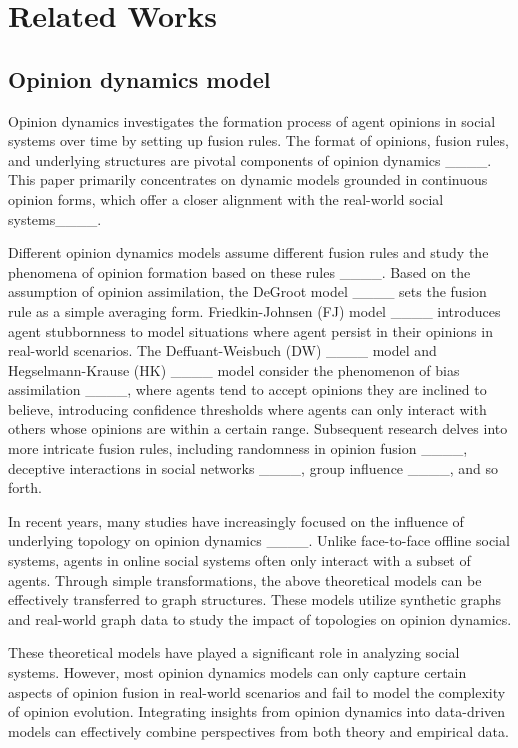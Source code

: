 \section{Related Works}
\subsection{Opinion dynamics model}

Opinion dynamics investigates the formation process of agent opinions in social systems over time by setting up fusion rules. The format of opinions, fusion rules, and underlying structures are pivotal components of opinion dynamics ____. This paper primarily concentrates on dynamic models grounded in continuous opinion forms, which offer a closer alignment with the real-world social systems____.

Different opinion dynamics models assume different fusion rules and study the phenomena of opinion formation based on these rules ____. Based on the assumption of opinion assimilation, the DeGroot model ____ sets the fusion rule as a simple averaging form. Friedkin-Johnsen (FJ) model ____ introduces agent stubbornness to model situations where agent persist in their opinions in real-world scenarios. The Deffuant-Weisbuch (DW) ____ model and Hegselmann-Krause (HK) ____ model consider the phenomenon of bias assimilation ____, where agents tend to accept opinions they are inclined to believe, introducing confidence thresholds where agents can only interact with others whose opinions are within a certain range. Subsequent research delves into more intricate fusion rules, including randomness in opinion fusion ____, deceptive interactions in social networks ____, group influence ____, and so forth.

In recent years, many studies have increasingly focused on the influence of underlying topology on opinion dynamics ____. Unlike face-to-face offline social systems, agents in online social systems often only interact with a subset of agents. Through simple transformations, the above theoretical models can be effectively transferred to graph structures. These models utilize synthetic graphs and real-world graph data to study the impact of topologies on opinion dynamics.

These theoretical models have played a significant role in analyzing social systems. However, most opinion dynamics models can only capture certain aspects of opinion fusion in real-world scenarios and fail to model the complexity of opinion evolution. Integrating insights from opinion dynamics into data-driven models can effectively combine perspectives from both theory and empirical data.


